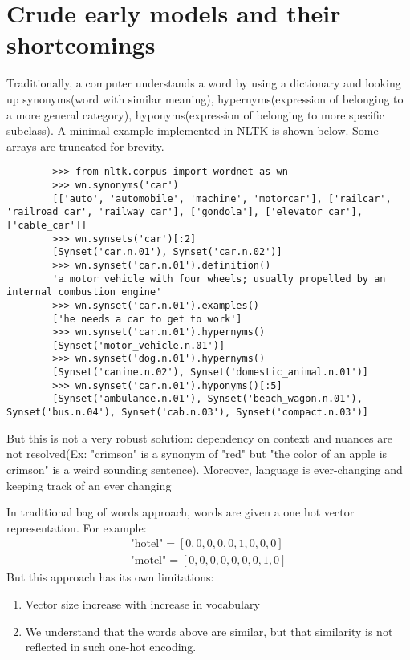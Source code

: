 \section{Crude early models and their shortcomings}

 Traditionally, a computer understands a word by using a dictionary and looking up synonyms(word with similar meaning), hypernyms(expression of belonging to a more general category), hyponyms(expression of belonging to more specific subclass). A minimal example implemented in NLTK is shown below. Some arrays are truncated for brevity.
    \begin{lstlisting}
        >>> from nltk.corpus import wordnet as wn
        >>> wn.synonyms('car')
        [['auto', 'automobile', 'machine', 'motorcar'], ['railcar', 'railroad_car', 'railway_car'], ['gondola'], ['elevator_car'], ['cable_car']]
        >>> wn.synsets('car')[:2]
        [Synset('car.n.01'), Synset('car.n.02')]
        >>> wn.synset('car.n.01').definition()
        'a motor vehicle with four wheels; usually propelled by an internal combustion engine'
        >>> wn.synset('car.n.01').examples()
        ['he needs a car to get to work']
        >>> wn.synset('car.n.01').hypernyms()
        [Synset('motor_vehicle.n.01')]
        >>> wn.synset('dog.n.01').hypernyms()    
        [Synset('canine.n.02'), Synset('domestic_animal.n.01')]
        >>> wn.synset('car.n.01').hyponyms()[:5]
        [Synset('ambulance.n.01'), Synset('beach_wagon.n.01'), Synset('bus.n.04'), Synset('cab.n.03'), Synset('compact.n.03')]
    \end{lstlisting}
But this is not a very robust solution: dependency on context and nuances are not resolved(Ex: "crimson" is a synonym of "red" but "the color of an apple is crimson" is a weird sounding sentence).  Moreover, language is ever-changing and keeping track of an ever changing 
    \begin{marginfigure}%
        
    \end{marginfigure}%
In traditional bag of words approach, words are given a one hot vector representation. For example:
\begin{align*}
    \text{"hotel"}=[0,0,0,0,0,1,0,0,0]\\
    \text{"motel"}=[0,0,0,0,0,0,0,1,0]
\end{align*}
But this approach has its own limitations:
\begin{enumerate}
    \item Vector size increase with increase in vocabulary
    \item We understand that the words above are similar, but that similarity is not reflected in such one-hot encoding.
\end{enumerate}






